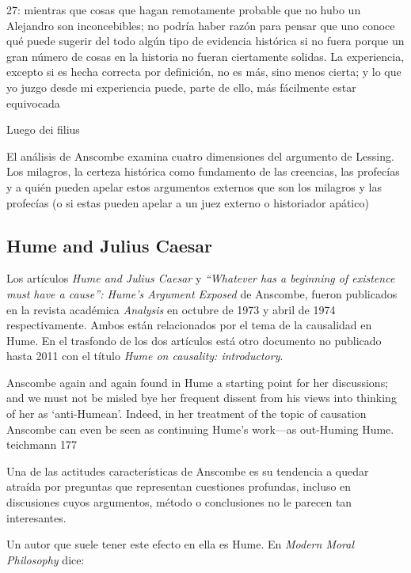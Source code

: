 27: mientras que cosas que hagan remotamente probable que no hubo un Alejandro
son inconcebibles; no podría haber razón para pensar que uno conoce qué puede
sugerir del todo algún tipo de evidencia histórica si no fuera porque un gran
número de cosas en la historia no fueran ciertamente solidas. La experiencia,
excepto si es hecha correcta por definición, no es más, sino menos cierta; y lo
que yo juzgo desde mi experiencia puede, parte de ello, más fácilmente estar
equivocada




Luego dei filius


El análisis de Anscombe examina cuatro dimensiones del argumento de Lessing. Los
milagros, la certeza histórica como fundamento de las creencias, las profecías y
a quién pueden apelar estos argumentos externos que son los milagros y las
profecías (o si estas pueden apelar a un juez externo o historiador apático)

\subsection{Hume and Julius Caesar}

Los artículos \emph{Hume and Julius Caesar} y \emph{``Whatever has a beginning
  of existence must have a cause'': Hume’s Argument Exposed} de Anscombe, fueron
publicados en la revista académica \emph{Analysis} en octubre de 1973 y abril de
1974 respectivamente. Ambos están relacionados por el tema de la causalidad en
Hume. En el trasfondo de los dos artículos está otro documento no publicado
hasta 2011 con el título \emph{Hume on causality: introductory}.

Anscombe again and again found in Hume a starting point for her discussions; and
we must not be misled bye her frequent dissent from his views into thinking of
her as `anti-Humean'. Indeed, in her treatment of the topic of causation
Anscombe can even be seen as continuing Hume's work---as out-Huming Hume.
teichmann 177

  Una de las actitudes características de Anscombe es su tendencia a quedar
  atraída por preguntas que representan cuestiones profundas, incluso en
  discusiones cuyos argumentos, método o conclusiones no le parecen tan
  interesantes.

  Un autor que suele tener este efecto en ella es Hume. En \emph{Modern Moral
    Philosophy} dice:

